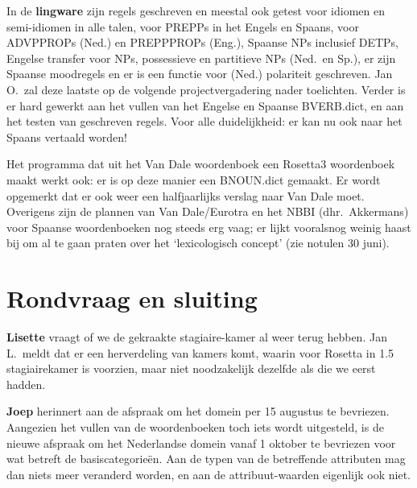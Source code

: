 In de {\bf lingware} zijn regels geschreven en meestal ook getest voor idiomen 
en semi-idiomen in 
alle talen, voor PREPPs in het Engels en Spaans, voor ADVPPROPs (Ned.) en 
PREPPPROPs (Eng.), Spaanse 
NPs inclusief DETPs, Engelse transfer voor NPs, possessieve en partitieve 
NPs (Ned.\ en Sp.), er zijn Spaanse moodregels en er is een functie voor 
(Ned.)
polariteit geschreven. Jan O.\ zal deze laatste op de volgende 
projectvergadering nader toelichten. Verder is er hard gewerkt aan het vullen 
van het Engelse en Spaanse BVERB.dict, en aan het testen van geschreven regels. 
Voor alle duidelijkheid: er kan nu ook naar het Spaans vertaald worden!

Het programma dat uit het Van Dale woordenboek een Rosetta3 woordenboek maakt 
werkt ook: er is op deze manier een BNOUN.dict gemaakt. Er wordt opgemerkt dat 
er ook weer een halfjaarlijks verslag naar Van Dale moet. Overigens zijn de 
plannen van Van Dale/Eurotra en het NBBI (dhr.\ Akkermans) voor Spaanse 
woor\-denboeken nog steeds erg vaag; er lijkt vooralsnog weinig haast bij om al 
te gaan praten over het `lexicologisch concept' (zie notulen 30 juni).


\section{Rondvraag en sluiting}

{\bf Lisette} vraagt of we de gekraakte stagiaire-kamer al weer terug hebben. 
Jan L.\ meldt dat er een herverdeling van kamers komt, waarin voor Rosetta in 
1.5 stagiairekamer is voorzien, maar niet noodzakelijk dezelfde als die we 
eerst hadden.

{\bf Joep} herinnert aan de afspraak om het domein per 15 augustus te
 bevriezen. Aangezien het vullen van de woordenboeken toch iets wordt 
uitgesteld, is de nieuwe afspraak om het Nederlandse domein vanaf 1 oktober te 
bevriezen voor wat betreft de basiscategorie\"{e}n. Aan de typen van de 
betreffende attributen mag dan niets 
meer veranderd worden, en aan de attribuut-waarden eigenlijk ook niet.



